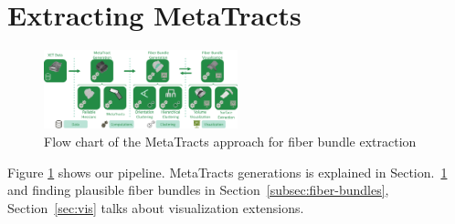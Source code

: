 


\section {Extracting MetaTracts }
\label{sec:approach}

\begin{figure}[t]
	\centering
\includegraphics[width=0.5\textwidth]{images_pvis/workflow.png}
\caption{Flow chart of the MetaTracts approach for fiber bundle extraction}
\label{fig:flowchart}
\end{figure}

Figure \ref{fig:flowchart} shows our pipeline. MetaTracts generations  is explained in Section.~\ref{sec:approach} and  finding plausible fiber bundles in Section~\ref{subsec:fiber-bundles}, Section~\ref{sec:vis} talks about visualization extensions.


